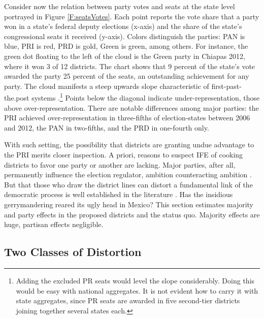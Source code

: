 \documentclass[letter,12pt]{article}
\begin{document}
Consider now the relation between party votes and seats at the state level portrayed in Figure \ref{F:seatsVotes}. Each point reports the vote share that a party won in a state's federal deputy elections (x-axis) and the share of the state's congressional seats it received (y-axis). Colors distinguish the parties: PAN is blue, PRI is red, PRD is gold, Green is green, among others. For instance, the green dot floating to the left of the cloud is the Green party in Chiapas 2012, where it won 3 of 12 districts. The chart shows that 9 percent of the state's vote awarded the party 25 percent of the seats, an outstanding achievement for any party. The cloud manifests a steep upwards slope characteristic of first-past-the.post systems \citep{taagepera.CubeLaw.1973}.\footnote{Adding the excluded PR seats would level the slope considerably. Doing this would be easy with national aggregates. It is not evident how to carry it with state aggregates, since PR seats are awarded in five second-tier districts joining together several states each.} Points below the diagonal indicate under-representation, those above over-representation. There are notable differences among major parties: the PRI achieved over-representation in three-fifths of election-states between 2006 and 2012, the PAN in two-fifths, and the PRD in one-fourth only. 

With such setting, the possibility that districts are granting undue advantage to the PRI merits closer inspection. A priori, reasons to suspect IFE of cooking districts to favor one party or another are lacking. Major parties, after all, permanently influence the election regulator, ambition counteracting ambition \citep{estevez.magar.rosas.2008}. But that those who draw the district lines can distort a fundamental link of the democratic process is well established in the literature \citep{altman.mcdonald2011bard,cox.katz.2002,engstrom2006redisttrictApsr,rossiter.etal.1997,king.1990elRespBiasMultiparty,balinskiYoung2001FairRep,otero.2003}. Has the insidious gerrymandering reared its ugly head in Mexico? This section estimates majority and party effects in the proposed districts and the status quo. Majority effects are huge, partisan effects negligible. 

\subsection{Two Classes of Distortion}
\end{document}
